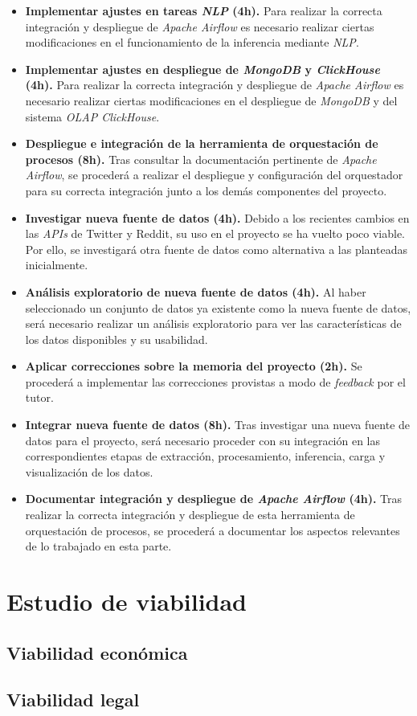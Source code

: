 \begin{itemize}
    \item \textbf{Implementar ajustes en tareas \textit{NLP} (4h).} Para realizar la correcta integración y despliegue de \textit{Apache Airflow} es necesario realizar ciertas modificaciones en el funcionamiento de la inferencia mediante \textit{NLP}.
    
    \item \textbf{Implementar ajustes en despliegue de \textit{MongoDB} y \textit{ClickHouse} (4h).} Para realizar la correcta integración y despliegue de \textit{Apache Airflow} es necesario realizar ciertas modificaciones en el despliegue de \textit{MongoDB} y del sistema \textit{OLAP ClickHouse}.
    
    \item \textbf{Despliegue e integración de la herramienta de orquestación de procesos (8h).} Tras consultar la documentación pertinente de \textit{Apache Airflow}, se procederá a realizar el despliegue y configuración del orquestador para su correcta integración junto a los demás componentes del proyecto.
    
    \item \textbf{Investigar nueva fuente de datos (4h).} Debido a los recientes cambios en las \textit{APIs} de Twitter y Reddit, su uso en el proyecto se ha vuelto poco viable. Por ello, se investigará otra fuente de datos como alternativa a las planteadas inicialmente.

    \item \textbf{Análisis exploratorio de nueva fuente de datos (4h).} Al haber seleccionado un conjunto de datos ya existente como la nueva fuente de datos, será necesario realizar un análisis exploratorio para ver las características de los datos disponibles y su usabilidad.

    \item \textbf{Aplicar correcciones sobre la memoria del proyecto (2h).} Se procederá a implementar las correcciones provistas a modo de \textit{feedback} por el tutor.

    \item \textbf{Integrar nueva fuente de datos (8h).} Tras investigar una nueva fuente de datos para el proyecto, será necesario proceder con su integración en las correspondientes etapas de extracción, procesamiento, inferencia, carga y visualización de los datos.

    \item \textbf{Documentar integración y despliegue de \textit{Apache Airflow} (4h).} Tras realizar la correcta integración y despliegue de esta herramienta de orquestación de procesos, se procederá a documentar los aspectos relevantes de lo trabajado en esta parte.

\end{itemize}


\section{Estudio de viabilidad}

\subsection{Viabilidad económica}

\subsection{Viabilidad legal}
